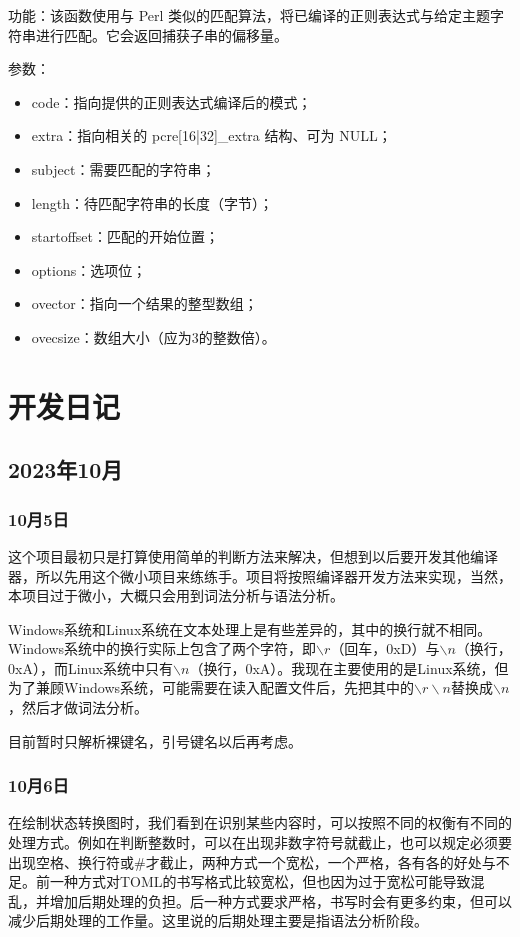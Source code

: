 功能：该函数使用与 Perl 类似的匹配算法，将已编译的正则表达式与给定主题字符串进行匹配。它会返回捕获子串的偏移量。

参数：
\begin{itemize}
\item code：指向提供的正则表达式编译后的模式；
\item extra：指向相关的 pcre[16|32]\_extra 结构、可为 NULL；
\item subject：需要匹配的字符串；
\item length：待匹配字符串的长度（字节）；
\item startoffset：匹配的开始位置；
\item options：选项位；
\item ovector：指向一个结果的整型数组；
\item ovecsize：数组大小（应为3的整数倍）。
\end{itemize}


\chapter{开发日记}


\section{2023年10月}


\subsection{10月5日}
这个项目最初只是打算使用简单的判断方法来解决，但想到以后要开发其他编译器，所以先用这个微小项目来练练手。项目将按照编译器开发方法来实现，当然，本项目过于微小，大概只会用到词法分析与语法分析。

Windows系统和Linux系统在文本处理上是有些差异的，其中的换行就不相同。Windows系统中的换行实际上包含了两个字符，即$\backslash r$（回车，0xD）与$\backslash n$（换行，0xA），而Linux系统中只有$\backslash n$（换行，0xA）。我现在主要使用的是Linux系统，但为了兼顾Windows系统，可能需要在读入配置文件后，先把其中的$\backslash r\backslash n$替换成$\backslash n$，然后才做词法分析。

目前暂时只解析裸键名，引号键名以后再考虑。


\subsection{10月6日}
在绘制状态转换图时，我们看到在识别某些内容时，可以按照不同的权衡有不同的处理方式。例如在判断整数时，可以在出现非数字符号就截止，也可以规定必须要出现空格、换行符或\#才截止，两种方式一个宽松，一个严格，各有各的好处与不足。前一种方式对TOML的书写格式比较宽松，但也因为过于宽松可能导致混乱，并增加后期处理的负担。后一种方式要求严格，书写时会有更多约束，但可以减少后期处理的工作量。这里说的后期处理主要是指语法分析阶段。


